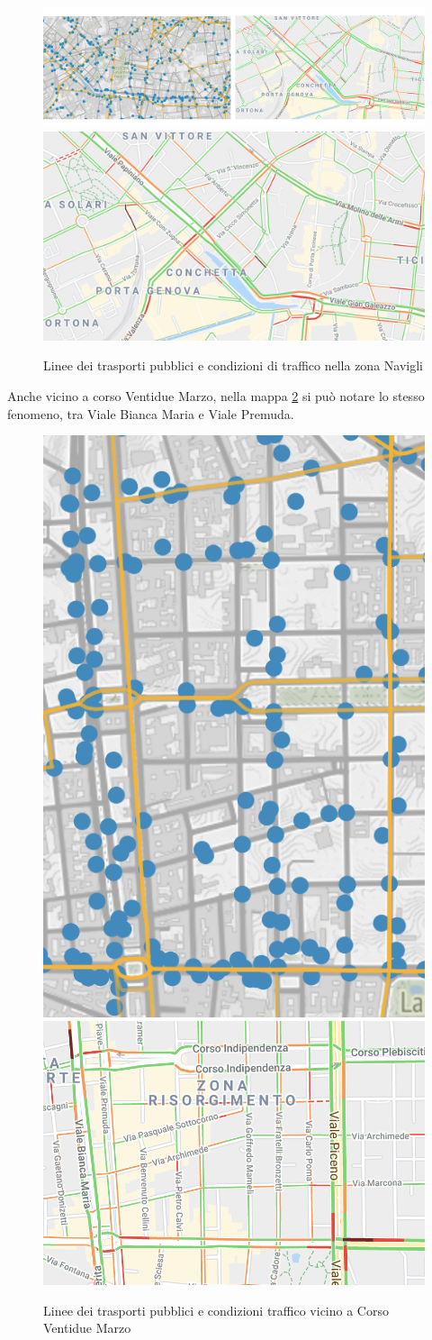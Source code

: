 \documentclass[a4paper,12pt]{report}
\begin{document}
\begin{figure}
    \includegraphics[width=0.51\linewidth]{../src/atm/navigli.png}
    \includegraphics[width=0.49\linewidth]{img/navigli.png}
    \caption{Linee dei trasporti pubblici e condizioni di traffico nella zona Navigli}
    \label{fig:navigli}
\end{figure}

Anche vicino a corso Ventidue Marzo, nella mappa \ref{fig:22-marzo} si può 
notare lo stesso fenomeno, tra Viale Bianca Maria e Viale Premuda.

\begin{figure}
    \includegraphics[width=0.25\linewidth]{../src/atm/22_marzo.png}
    \includegraphics[width=0.55\linewidth]{img/22_marzo.png}
    \caption{Linee dei trasporti pubblici e condizioni traffico vicino a Corso Ventidue Marzo}
    \label{fig:22-marzo}
\end{figure}
\end{document}
